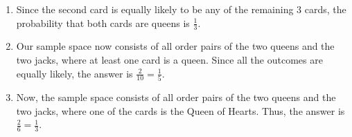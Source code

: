\begin{enumerate}[label=(\alph*)]

\item Since the second card is equally likely to be any of the remaining $3$ cards,
the probability that both cards are queens is $\frac{1}{3}$.

\item Our sample space now consists of all order pairs of the two queens and the two jacks,
where at least one card is a queen. Since all the outcomes are equally likely,
the answer is $\frac{2}{10} = \frac{1}{5}$.

\item Now, the sample space consists of all order pairs of the two queens and the two jacks,
where one of the cards is the Queen of Hearts. Thus, the answer is $\frac{2}{6} = \frac{1}{3}$.

\end{enumerate}